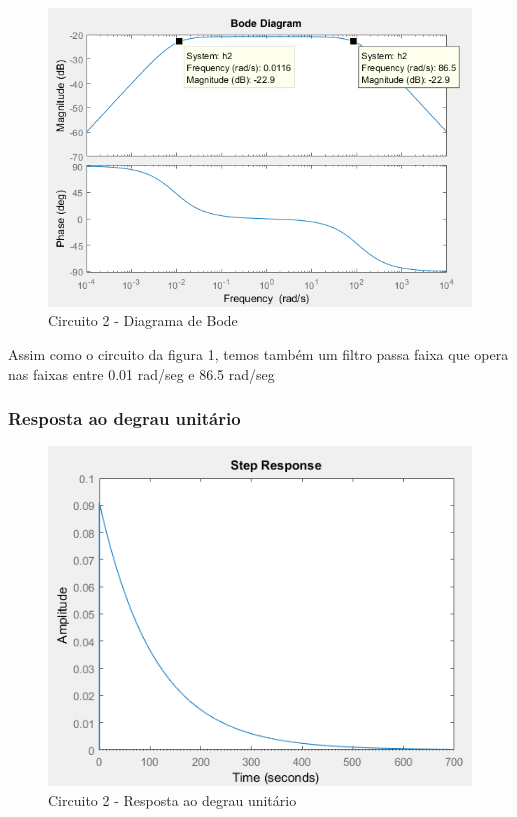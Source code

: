 \documentclass[a4paper, 12pt]{article}
\begin{document}
			\begin{figure}[!ht]
				\centering
				\includegraphics[scale=0.7]{img/1f_circ2.png}
				\caption{Circuito 2 - Diagrama de Bode}
			\end{figure}
			\newpage
			Assim como o circuito da figura 1, temos também um filtro passa faixa que opera nas faixas entre 0.01 rad/seg e 86.5 rad/seg

			\subsubsection{Resposta ao degrau unitário}
			\begin{figure}[!ht]
				\centering
				\includegraphics[scale=0.71]{img/1g_circ2.png}
				\caption{Circuito 2 - Resposta ao degrau unitário}
			\end{figure}
\end{document}
